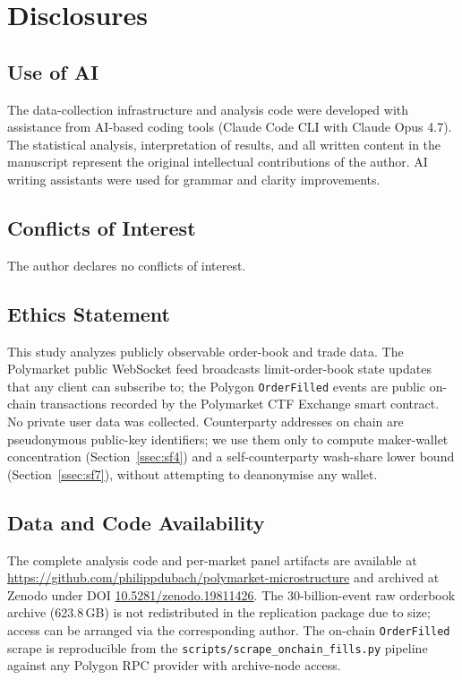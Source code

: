 \section{Disclosures}\label{sec:disclosures}

\subsection{Use of AI}

The data-collection infrastructure and analysis code were developed
with assistance from AI-based coding tools (Claude Code CLI with
Claude Opus 4.7). The statistical analysis, interpretation of
results, and all written content in the manuscript represent the
original intellectual contributions of the author. AI writing
assistants were used for grammar and clarity improvements.

\subsection{Conflicts of Interest}

The author declares no conflicts of interest.

\subsection{Ethics Statement}

This study analyzes publicly observable order-book and trade data.
The Polymarket public WebSocket feed broadcasts limit-order-book
state updates that any client can subscribe to; the Polygon
\texttt{OrderFilled} events are public on-chain transactions
recorded by the Polymarket CTF Exchange smart contract. No private
user data was collected. Counterparty addresses on chain are
pseudonymous public-key identifiers; we use them only to compute
maker-wallet concentration (Section~\ref{ssec:sf4}) and a
self-counterparty wash-share lower bound (Section~\ref{ssec:sf7}),
without attempting to deanonymise any wallet.

\subsection{Data and Code Availability}

The complete analysis code and per-market panel artifacts are
available at \url{https://github.com/philippdubach/polymarket-microstructure}
and archived at Zenodo under DOI
\href{https://doi.org/10.5281/zenodo.19811426}{10.5281/zenodo.19811426}.
The 30-billion-event raw orderbook archive (623.8\,GB) is not
redistributed in the replication package due to size; access can be
arranged via the corresponding author. The on-chain
\texttt{OrderFilled} scrape is reproducible from the
\texttt{scripts/scrape\_onchain\_fills.py} pipeline against any
Polygon RPC provider with archive-node access.
